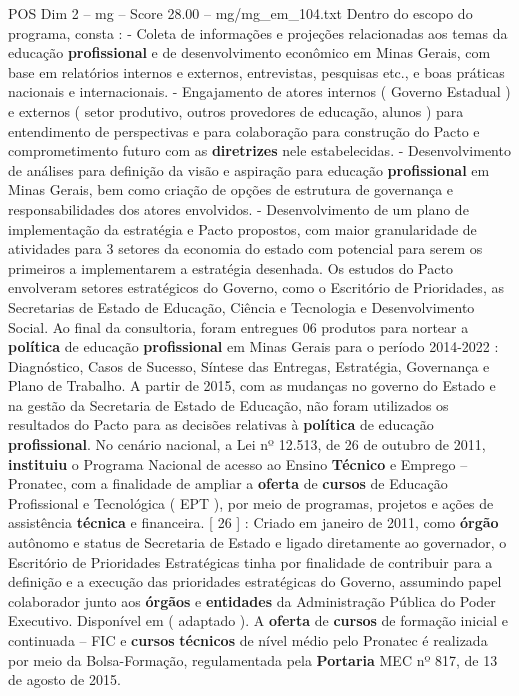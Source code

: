 \begin{textsample}{POS Dim 2 – mg – Score 28.00 – mg/mg\_em\_104.txt}
Dentro do escopo do programa, consta : - Coleta de informações e projeções relacionadas aos temas da educação \textbf{profissional} e de desenvolvimento econômico em Minas Gerais, com base em relatórios internos e externos, entrevistas, pesquisas etc., e boas práticas nacionais e internacionais. - Engajamento de atores internos ( Governo Estadual ) e externos ( setor produtivo, outros provedores de educação, alunos ) para entendimento de perspectivas e para colaboração para construção do Pacto e comprometimento futuro com as \textbf{diretrizes} nele estabelecidas. - Desenvolvimento de análises para definição da visão e aspiração para educação \textbf{profissional} em Minas Gerais, bem como criação de opções de estrutura de governança e responsabilidades dos atores envolvidos. - Desenvolvimento de um plano de implementação da estratégia e Pacto propostos, com maior granularidade de atividades para 3 setores da economia do estado com potencial para serem os primeiros a implementarem a estratégia desenhada.
Os estudos do Pacto envolveram setores estratégicos do Governo, como o Escritório de Prioridades, as Secretarias de Estado de Educação, Ciência e Tecnologia e Desenvolvimento Social.
Ao final da consultoria, foram entregues 06 produtos para nortear a \textbf{política} de educação \textbf{profissional} em Minas Gerais para o período 2014-2022 : Diagnóstico, Casos de Sucesso, Síntese das Entregas, Estratégia, Governança e Plano de Trabalho.
A partir de 2015, com as mudanças no governo do Estado e na gestão da Secretaria de Estado de Educação, não foram utilizados os resultados do Pacto para as decisões relativas à \textbf{política} de educação \textbf{profissional}.
No cenário nacional, a Lei nº 12.513, de 26 de outubro de 2011, \textbf{instituiu} o Programa Nacional de acesso ao Ensino \textbf{Técnico} e Emprego – Pronatec, com a finalidade de ampliar a \textbf{oferta} de \textbf{cursos} de Educação Profissional e Tecnológica ( EPT ), por meio de programas, projetos e ações de assistência \textbf{técnica} e financeira. [ 26 ] : Criado em janeiro de 2011, como \textbf{órgão} autônomo e status de Secretaria de Estado e ligado diretamente ao governador, o Escritório de Prioridades Estratégicas tinha por finalidade de contribuir para a definição e a execução das prioridades estratégicas do Governo, assumindo papel colaborador junto aos \textbf{órgãos} e \textbf{entidades} da Administração Pública do Poder Executivo.
Disponível em ( adaptado ).
A \textbf{oferta} de \textbf{cursos} de formação inicial e continuada – FIC e \textbf{cursos} \textbf{técnicos} de nível médio pelo Pronatec é realizada por meio da Bolsa-Formação, regulamentada pela \textbf{Portaria} MEC nº 817, de 13 de agosto de 2015.

\end{textsample}
